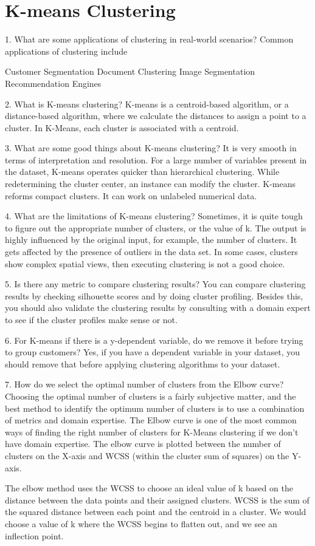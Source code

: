 
	\chapter{K-means Clustering}

1. What are some applications of clustering in real-world scenarios?
Common applications of clustering include

Customer Segmentation
Document Clustering
Image Segmentation
Recommendation Engines


2. What is K-means clustering?
K-means is a centroid-based algorithm, or a distance-based algorithm, where we calculate the distances to assign a point to a cluster. In K-Means, each cluster is associated with a centroid.



3. What are some good things about K-means clustering?
It is very smooth in terms of interpretation and resolution.
For a large number of variables present in the dataset, K-means operates quicker than hierarchical clustering.
While redetermining the cluster center, an instance can modify the cluster.
K-means reforms compact clusters.
It can work on unlabeled numerical data.


4. What are the limitations of K-means clustering?
Sometimes, it is quite tough to figure out the appropriate number of clusters, or the value of k.
The output is highly influenced by the original input, for example, the number of clusters.
It gets affected by the presence of outliers in the data set.
In some cases, clusters show complex spatial views, then executing clustering is not a good choice.


5. Is there any metric to compare clustering results?
You can compare clustering results by checking silhouette scores and by doing cluster profiling. Besides this, you should also validate the clustering results by consulting with a domain expert to see if the cluster profiles make sense or not.



6. For K-means if there is a y-dependent variable, do we remove it before trying to group customers?
Yes, if you have a dependent variable in your dataset, you should remove that before applying clustering algorithms to your dataset.



7. How do we select the optimal number of clusters from the Elbow curve?
Choosing the optimal number of clusters is a fairly subjective matter, and the best method to identify the optimum number of clusters is to use a combination of metrics and domain expertise. The Elbow curve is one of the most common ways of finding the right number of clusters for K-Means clustering if we don't have domain expertise. The elbow curve is plotted between the number of clusters on the X-axis and WCSS (within the cluster sum of squares) on the Y-axis.

The elbow method uses the WCSS to choose an ideal value of k based on the distance between the data points and their assigned clusters. WCSS is the sum of the squared distance between each point and the centroid in a cluster. We would choose a value of k where the WCSS begins to flatten out, and we see an inflection point. 